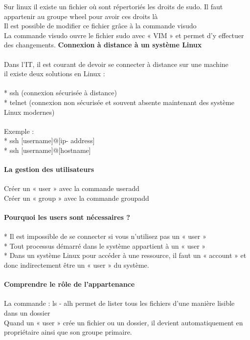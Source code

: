 \documentclass[10pt,a4paper]{article}
\begin{document}
Sur linux il existe un fichier où sont répertoriés les droits de sudo. Il faut appartenir au groupe wheel pour avoir ces droits là\\
Il est possible de modifier ce fichier grâce à la commande visudo\\
La commande visudo ouvre le fichier sudo avec « VIM » et permet d’y effectuer des changements. 
{\large\textbf{Connexion à distance à un système Linux}}\\\\
Dans l’IT, il est courant de devoir se connecter à distance sur une machine\\
il existe deux solutions en Linux : \\\\
* ssh (connexion sécurisée à distance)\\
* telnet (connexion non sécurisée et souvent absente maintenant des système Linux modernes)\\\\
Exemple : \\
* ssh [username]@[ip- address]\\
* ssh [username]@[hostname] \\\\
{\large\textbf{La gestion des utilisateurs}}\\\\
Créer un « user » avec la commande useradd\\
Créer un « group » avec la commande groupadd\\\\
{\large\textbf{Pourquoi les users sont nécessaires ? }}\\\\
* Il est impossible de se connecter si vous n’utilisez pas un « user » \\
* Tout processus démarré dans le système appartient à un « user »\\
* Dans un système Linux pour accéder à une ressource, il faut un « account » et donc indirectement être un « user » du système. \\\\
{\large\textbf{Comprendre le rôle de l’appartenance}}\\\\
La commande : ls - alh  permet de lister tous les fichiers d’une manière lisible dans un dossier\\
Quand un « user » crée un fichier ou un dossier, il devient automatiquement en propriétaire ainsi que son groupe primaire.\\
\end{document}
